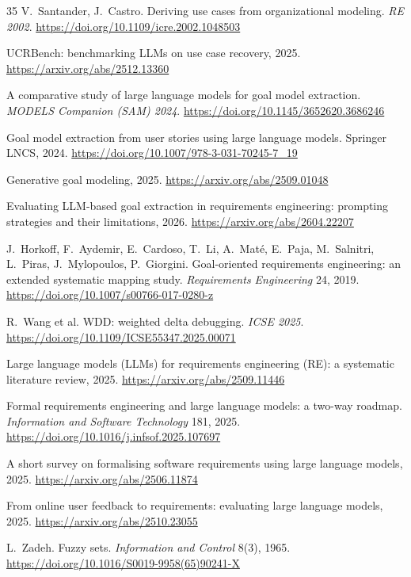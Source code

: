\documentclass[sigconf,nonacm]{acmart}
\begin{document}
\begin{thebibliography}{35}
 V.~Santander, J.~Castro. Deriving use
cases from organizational modeling. \emph{RE 2002}.
\url{https://doi.org/10.1109/icre.2002.1048503}

 UCRBench: benchmarking LLMs on use case
recovery, 2025. \url{https://arxiv.org/abs/2512.13360}

 A comparative study of large language models
for goal model extraction. \emph{MODELS Companion (SAM) 2024}.
\url{https://doi.org/10.1145/3652620.3686246}

 Goal model extraction from user stories
using large language models. Springer LNCS, 2024.
\url{https://doi.org/10.1007/978-3-031-70245-7_19}

 Generative goal modeling, 2025.
\url{https://arxiv.org/abs/2509.01048}

 Evaluating LLM-based goal extraction in
requirements engineering: prompting strategies and their
limitations, 2026. \url{https://arxiv.org/abs/2604.22207}

 J.~Horkoff, F.~Aydemir, E.~Cardoso,
T.~Li, A.~Mat\'e, E.~Paja, M.~Salnitri, L.~Piras,
J.~Mylopoulos, P.~Giorgini. Goal-oriented requirements
engineering: an extended systematic mapping study.
\emph{Requirements Engineering} 24, 2019.
\url{https://doi.org/10.1007/s00766-017-0280-z}

 R.~Wang et al. WDD: weighted delta debugging.
\emph{ICSE 2025}.
\url{https://doi.org/10.1109/ICSE55347.2025.00071}

 Large language models (LLMs) for
requirements engineering (RE): a systematic literature review,
2025. \url{https://arxiv.org/abs/2509.11446}

 Formal requirements engineering and large
language models: a two-way roadmap. \emph{Information and
Software Technology} 181, 2025.
\url{https://doi.org/10.1016/j.infsof.2025.107697}

 A short survey on formalising
software requirements using large language models, 2025.
\url{https://arxiv.org/abs/2506.11874}

 From online user feedback to
requirements: evaluating large language models, 2025.
\url{https://arxiv.org/abs/2510.23055}

 L.~Zadeh. Fuzzy sets. \emph{Information and
Control} 8(3), 1965.
\url{https://doi.org/10.1016/S0019-9958(65)90241-X}

\end{thebibliography}
\end{document}
